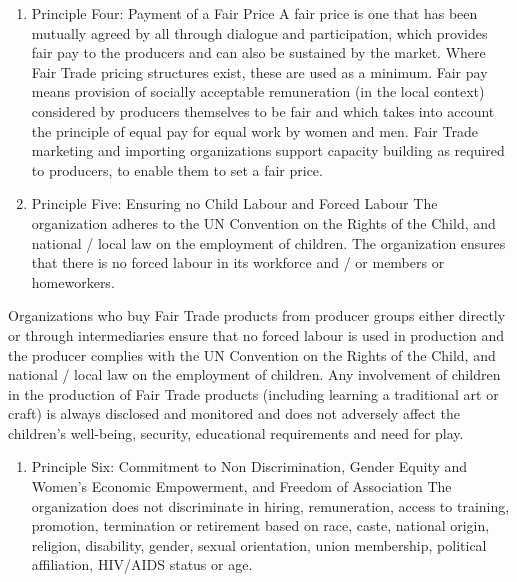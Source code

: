 \documentclass[]{book}
\providecommand{\tightlist}{%
  \setlength{\itemsep}{0pt}\setlength{\parskip}{0pt}}
\begin{document}
\begin{enumerate}
\def\labelenumi{\arabic{enumi}.}
\setcounter{enumi}{3}
\item
  Principle Four: Payment of a Fair Price
  A fair price is one that has been mutually agreed by all through dialogue and participation, which provides fair pay to the producers and can also be sustained by the market. Where Fair Trade pricing structures exist, these are used as a minimum. Fair pay means provision of socially acceptable remuneration (in the local context) considered by producers themselves to be fair and which takes into account the principle of equal pay for equal work by women and men. Fair Trade marketing and importing organizations support capacity building as required to producers, to enable them to set a fair price.
\item
  Principle Five: Ensuring no Child Labour and Forced Labour
  The organization adheres to the UN Convention on the Rights of the Child, and national / local law on the employment of children. The organization ensures that there is no forced labour in its workforce and / or members or homeworkers.
\end{enumerate}

Organizations who buy Fair Trade products from producer groups either directly or through intermediaries ensure that no forced labour is used in production and the producer complies with the UN Convention on the Rights of the Child, and national / local law on the employment of children. Any involvement of children in the production of Fair Trade products (including learning a traditional art or craft) is always disclosed and monitored and does not adversely affect the children's well-being, security, educational requirements and need for play.

\begin{enumerate}
\def\labelenumi{\arabic{enumi}.}
\setcounter{enumi}{5}
\tightlist
\item
  Principle Six: Commitment to Non Discrimination, Gender Equity and Women's Economic Empowerment, and Freedom of Association
  The organization does not discriminate in hiring, remuneration, access to training, promotion, termination or retirement based on race, caste, national origin, religion, disability, gender, sexual orientation, union membership, political affiliation, HIV/AIDS status or age.
\end{enumerate}
\end{document}

